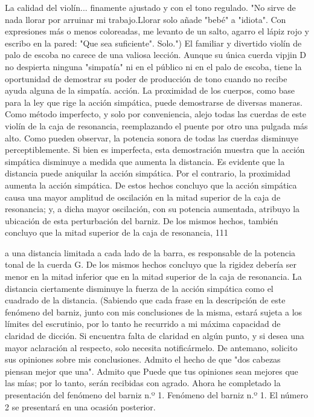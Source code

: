 La calidad del violín... finamente ajustado y con el tono regulado. "No sirve de nada llorar por arruinar mi trabajo.Llorar solo añade "bebé" a "idiota". Con expresiones más o menos coloreadas, me levanto de un salto, agarro el lápiz rojo y escribo en la pared: "Que sea suficiente".
Solo.")
El familiar y divertido violín de palo de escoba no carece de una valiosa lección. Aunque su única cuerda vipjin D no despierta ninguna "simpatía" ni en el público ni en el palo de escoba, tiene la oportunidad de demostrar su poder de producción de tono cuando no recibe ayuda alguna de la simpatía.
acción.	
La proximidad de los cuerpos, como base para la ley que rige la acción simpática, puede demostrarse de diversas maneras. Como método imperfecto, y solo por conveniencia, alejo todas las cuerdas de este violín de la caja de resonancia, reemplazando el puente por otro una pulgada más alto. Como pueden observar, la potencia sonora de todas las cuerdas disminuye perceptiblemente. Si bien es imperfecta, esta demostración muestra que la acción simpática disminuye a medida que aumenta la distancia.
Es evidente que la distancia puede aniquilar la acción simpática. Por el contrario, la proximidad aumenta la acción simpática. De estos hechos concluyo que la acción simpática causa una mayor amplitud de oscilación en la mitad superior de la caja de resonancia; y, a dicha mayor oscilación, con su potencia aumentada, atribuyo la ubicación de esta perturbación del barniz. De los mismos hechos, también concluyo que la mitad superior de la caja de resonancia,
111

a una distancia limitada a cada lado de la barra, es responsable de la potencia tonal de la cuerda G. De los mismos hechos concluyo que la rigidez debería ser menor en la mitad inferior que en la mitad superior de la caja de resonancia. La distancia ciertamente disminuye la fuerza de la acción simpática como el cuadrado de la distancia. (Sabiendo que cada frase en la descripción de este fenómeno del barniz, junto con mis conclusiones de la misma, estará sujeta a los límites del escrutinio, por lo tanto he recurrido a mi máxima capacidad de claridad de dicción. Si encuentra falta de claridad en algún punto, y si desea una mayor aclaración al respecto, solo necesita notificármelo. De antemano, solicito sus opiniones sobre mis conclusiones. Admito el hecho de que "dos cabezas piensan mejor que una". Admito que
Puede que tus opiniones sean mejores que las mías; por lo tanto, serán recibidas con agrado.
Ahora he completado la presentación del fenómeno del barniz n.º 1. Fenómeno del barniz n.º 1.
El número 2 se presentará en una ocasión posterior.

